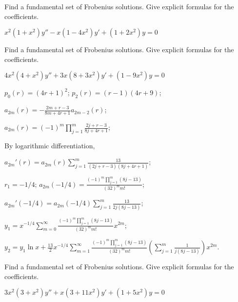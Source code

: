 \documentclass{ximera}
\begin{document}
\begin{problem}\label{exer:7.6.33}
Find a
fundamental set of Frobenius solutions. Give explicit formulas for the
coefficients.

$x^2(1+x^2)y''-x(1-4x^2)y'+(1+2x^2)y=0$
\end{problem}

\begin{problem}\label{exer:7.6.34}
Find a
fundamental set of Frobenius solutions. Give explicit formulas for the
coefficients.

$4x^2(4+x^2)y''+3x(8+3x^2)y'+(1-9x^2)y=0$

\begin{solution}
    $p_0(r)=(4r+1)^2$;
$p_2(r)=(r-1)(4r+9)$;

$a_{2m}(r)=-\frac{2m+r-3}{8m+4r+1}
a_{2m-2}(r)$;

 $a_{2m}(r)=(-1)^m\prod_{j=1}^m\frac{2j+r-3}{8j+4r+1}$;

By logarithmic differentiation,

$a_{2m}'(r)=a_{2m}(r)\sum_{j=1}^m\frac{13}{(2j+r-3)(8j+4r+1)}$;

$r_1=-1/4$;
$a_{2m}(-1/4)=\frac{(-1)^m\prod_{j=1}^m(8j-13)}{(32)^mm!}$;

$a_{2m}'(-1/4)=a_{2m}(-1/4)\sum_{j=1}^m\frac{13}{2j(8j-13)}$;


$y_1=x^{-1/4}\sum_{m=0}^\infty\frac{(-1)^m\prod_{j=1}^m(8j-13)}{(32)^mm!}
x^{2m}$;

$y_2=y_1\ln
x+\frac{13}{2}x^{-1/4}\sum_{m=1}^\infty\frac{(-1)^m\prod_{j=1}^m(8j-13)}{(32)^mm!}
\left(\sum_{j=1}^m\frac{1}{ j(8j-13)}\right)x^{2m}$.
\end{solution}
\end{problem}

\begin{problem}\label{exer:7.6.35}
Find a
fundamental set of Frobenius solutions. Give explicit formulas for the
coefficients.

$3x^2(3+x^2)y''+x(3+11x^2)y'+(1+5x^2)y=0$
\end{problem}
\end{document}
